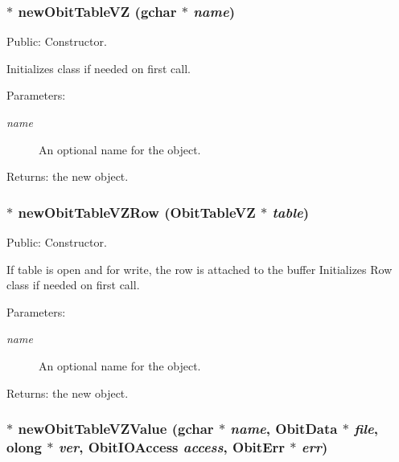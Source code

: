 \subsubsection{$\ast$ new\-Obit\-Table\-VZ (gchar $\ast$ {\em name})}\label{ObitTableVZ_8c_a16}


Public: Constructor. 

Initializes class if needed on first call. \begin{Desc}
\item[Parameters:]
\begin{description}
\item[{\em name}]An optional name for the object. \end{description}
\end{Desc}
\begin{Desc}
\item[Returns:]the new object. \end{Desc}
\subsubsection{$\ast$ new\-Obit\-Table\-VZRow ({\bf Obit\-Table\-VZ} $\ast$ {\em table})}\label{ObitTableVZ_8c_a14}


Public: Constructor. 

If table is open and for write, the row is attached to the buffer Initializes Row class if needed on first call. \begin{Desc}
\item[Parameters:]
\begin{description}
\item[{\em name}]An optional name for the object. \end{description}
\end{Desc}
\begin{Desc}
\item[Returns:]the new object. \end{Desc}
\subsubsection{$\ast$ new\-Obit\-Table\-VZValue (gchar $\ast$ {\em name}, {\bf Obit\-Data} $\ast$ {\em file}, {\bf olong} $\ast$ {\em ver}, Obit\-IOAccess {\em access}, {\bf Obit\-Err} $\ast$ {\em err})}\label{ObitTableVZ_8c_a18}


